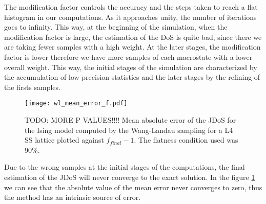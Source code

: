 The modification factor controls the accuracy and the steps taken to reach a flat histogram in our computations. As it approaches unity, the number of iterations goes to infinity. This way, at the beginning of the simulation, when the modification factor is large, the estimation of the DoS is quite bad, since there we are taking fewer samples with a high weight. At the later stages, the modification factor is lower therefore we have more samples of each macrostate with a lower overall weight. 
This way, the initial stages of the simulation are characterized by the accumulation of low precision statistics and the later stages by the refining of the firsts samples. 

\begin{figure}[h]
	\centering
	\texttt{[image: wl\_mean\_error\_f.pdf]}
	\caption{TODO: MORE P VALUES!!!! Mean absolute error of the JDoS for the Ising model computed by the Wang-Landau sampling for a L4 SS lattice plotted against $f_{final}-1$. The flatness condition used was 90\%.}
	\label{error_abs_wl}
\end{figure}
Due to the wrong samples at the initial stages of the computations, the final estimation of the JDoS will never converge to the exact solution. In the figure \ref{error_abs_wl} we can see that the absolute value of the mean error never converges to zero, thus the method has an intrinsic source of error. 








